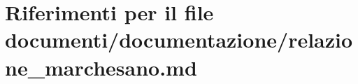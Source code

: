 \hypertarget{relazione__marchesano_8md}{}\section{Riferimenti per il file documenti/documentazione/relazione\+\_\+marchesano.md}
\label{relazione__marchesano_8md}
